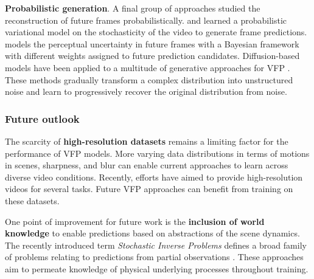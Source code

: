 \noindent
\textbf{Probabilistic generation}. A final group of approaches studied the reconstruction of future frames probabilistically. \citet{babaeizadeh2018stochastic} and \citet{denton2018stochastic} learned a probabilistic variational model on the stochasticity of the video to generate frame predictions. \citet{wang2020probabilistic} models the perceptual uncertainty in future frames with a Bayesian framework with different weights assigned to future prediction candidates. Diffusion-based models \citep{dhariwal2021diffusion,ho2020denoising,rombach2022high} have been applied to a multitude of generative approaches for VFP \citep{gu2023seer,hoppe2024diffusion,shrivastava2024video,voleti2022mcvd,ye2024stdiff,zhang2024extdm}. These methods gradually transform a complex distribution into unstructured noise and learn to progressively recover the original distribution from noise.

\subsubsection{Future outlook}


The scarcity of \textbf{high-resolution datasets} remains a limiting factor for the performance of VFP models. More varying data distributions in terms of motions in scenes, sharpness, and blur can enable current approaches to learn across diverse video conditions. Recently, efforts \citep{stergiou2024lavib,xue2022advancing} have aimed to provide high-resolution videos for several tasks. Future VFP approaches can benefit from training on these datasets. 

One point of improvement for future work is the \textbf{inclusion of world knowledge} to enable predictions based on abstractions of the scene dynamics. The recently introduced term \textit{Stochastic Inverse Problems} defines a broad family of problems relating to predictions from partial observations \citep{spielberg2023differentiable,tewari2023diffusion}. These approaches aim to permeate knowledge of physical underlying processes throughout training.



